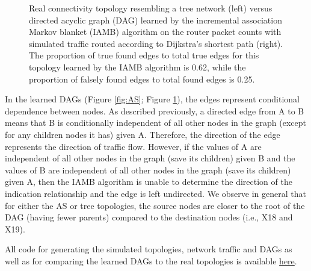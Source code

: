 \documentclass[conference]{IEEEtran}
\begin{document}
\begin{figure}%
    \centering
    \qquad
    \caption{ Real connectivity topology resembling a tree network (left) versus directed acyclic graph (DAG) learned by the incremental association Markov blanket (IAMB) algorithm on the router packet counts with simulated traffic routed according to Dijkstra's shortest path (right). The proportion of true found edges to total true edges for this topology learned by the IAMB algorithm is 0.62, while the proportion of falsely found edges to total found edges is 0.25.}%
    \label{fig:tree}%
\end{figure}

In the learned DAGs (Figure \ref{fig:AS}; Figure \ref{fig:tree}), the edges represent conditional dependence between nodes. As described previously, a directed edge from A to B means that B is conditionally independent of all other nodes in the graph (except for any children nodes it has) given A. Therefore, the direction of the edge represents the direction of traffic flow. However, if the values of A are independent of all other nodes in the graph (save its children) given B and the values of B are independent of all other nodes in the graph (save its children) given A, then the IAMB algorithm is unable to determine the direction of the indication relationship and the edge is left undirected. We observe in general that for either the AS or tree topologies, the source nodes are closer to the root of the DAG (having fewer parents) compared to the destination nodes (i.e., X18 and X19).

All code for generating the simulated topologies, network traffic and DAGs as well as for comparing the learned DAGs to the real topologies is available \href{https://github.com/fizzX/cs143-final}{here}.
\end{document}

